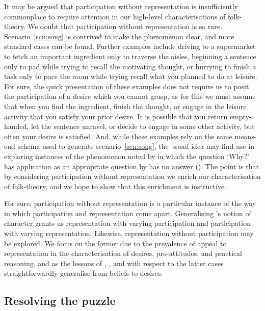 \documentclass[10pt]{article}
\begin{document}
It may be argued that participation without representation is insufficiently commonplace to require attention in our high-level characterisations of folk-theory.
We doubt that participation without representation is so rare.
Scenario~\ref{scn:song} is contrived to make the phenomenon clear, and more standard cases can be found.
Further examples include driving to a supermarket to fetch an important ingredient only to traverse the aisles, beginning a sentence only to pad while trying to recall the motivating thought, or hurrying to finish a task only to pace the room while trying recall what you planned to do at leisure.
For sure, the quick presentation of these examples does not require us to posit the participation of a desire which you cannot grasp, as for this we must assume that when you find the ingredient, finish the thought, or engage in the leisure activity that you satisfy your prior desire.
It is possible that you return empty-handed, let the sentence unravel, or decide to engage in some other activity, but often your desire is satisfied.
And, while these examples rely on the same means-end schema used to generate scenario~\ref{scn:song}, the broad idea may find use in exploring instances of the phenomenon noted by \citeauthor{Anscombe:1957aa} in which the question `Why?' has application as an appropriate question by has no answer (\citeyear[--18]{Anscombe:1957aa}).
The point is that by considering participation without representation we enrich our characterisation of folk-theory, and we hope to show that this enrichment is instructive.

For sure, participation without representation is a particular instance of the way in which participation and representation come apart.
Generalising \citeauthor{Kaplan:1989aa}'s notion of character grants us representation with varying participation and participation with varying representation.
Likewise, representation without participation may be explored.
We focus on the former due to the prevalence of appeal to representation in the characterisation of desires, pro-attitudes, and practical reasoning, and as the lessons of \citeauthor{Kaplan:1989ab}, \citeauthor{Lewis:1979aa}, and \citeauthor{Perry:1993aa} with respect to the latter cases straightforwardly generalise from beliefs to desires.

\subsection{Resolving the puzzle}
\label{sec:resolving-puzzle}
\end{document}
